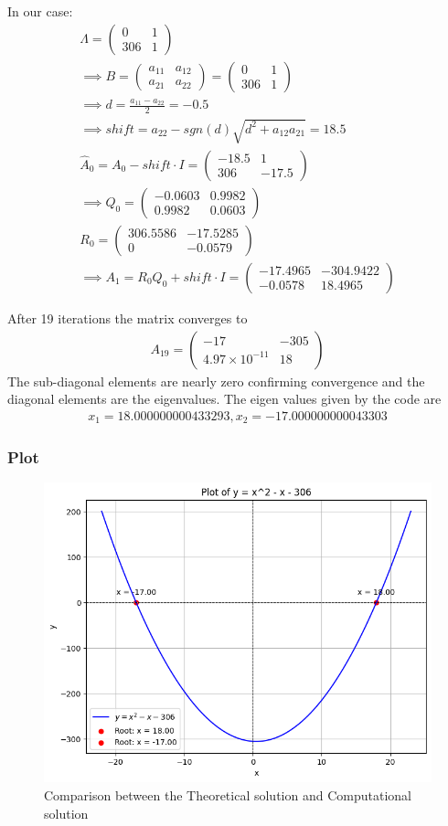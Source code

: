 \documentclass{beamer}
\providecommand{\brak}[1]{\ensuremath{\left(#1\right)}}
\theoremstyle{remark}
\newcommand{\myvec}[1]{\ensuremath{\begin{pmatrix}#1\end{pmatrix}}}
\numberwithin{equation}{section}
\begin{document}
\begin{frame}
In our case:
\begin{align}
    \Lambda=\myvec{0&1\\306&1}\\
    \implies B=\myvec{a_{11}&a_{12}\\a_{21}&a_{22}}=\myvec{0&1\\306&1}\\
    \implies d=\frac{a_{11}-a_{22}}{2}=-0.5\\
\implies shift=a_{22}-sgn\brak{d}\sqrt{d^2+a_{12}a_{21}}=18.5\\
    \hat{A}_0=A_0-shift\cdot I=\myvec{-18.5&1\\306&-17.5}\\
    \implies Q_0=\myvec{-0.0603&0.9982\\0.9982&0.0603}\\R_0=\myvec{306.5586&-17.5285\\0&-0.0579}\\
    \implies A_1=R_0Q_0+shift\cdot I=\myvec{-17.4965&-304.9422\\-0.0578&18.4965}
\end{align}
\end{frame}
\begin{frame}
After 19 iterations the matrix converges to
\begin{align}
    A_{19}=\myvec{-17&-305\\4.97\times 10^{-11}&18}
\end{align}
The sub-diagonal elements are nearly zero confirming convergence and the diagonal elements are the eigenvalues. The eigen values given by the code are
\begin{align}
	x_1 = 18.000000000433293,
	x_2 = -17.000000000043303
\end{align}
\end{frame}
\begin{frame}[fragile]
\frametitle{Plot}
\begin{figure}[h!]
   \centering
   \includegraphics[width=1\linewidth]{./figs/fig.png}
   \caption{Comparison between the Theoretical solution and Computational solution}
   \label{stemplot}
\end{figure}
\end{frame}
\end{document}

